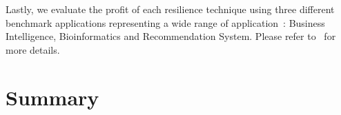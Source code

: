 Lastly, we evaluate 
the profit of each resilience technique using three different
benchmark applications representing a wide range of
application~\cite{mrbs}: Business Intelligence, Bioinformatics and
Recommendation System. Please refer to~\cite{cui_2014_closer} for more details.
%
%	
%
%

\section{Summary}

